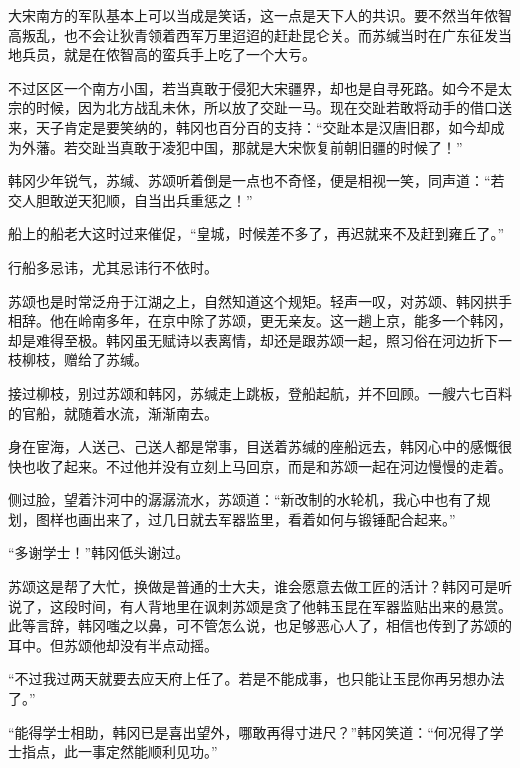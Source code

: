 大宋南方的军队基本上可以当成是笑话，这一点是天下人的共识。要不然当年侬智高叛乱，也不会让狄青领着西军万里迢迢的赶赴昆仑关。而苏缄当时在广东征发当地兵员，就是在侬智高的蛮兵手上吃了一个大亏。

不过区区一个南方小国，若当真敢于侵犯大宋疆界，却也是自寻死路。如今不是太宗的时候，因为北方战乱未休，所以放了交趾一马。现在交趾若敢将动手的借口送来，天子肯定是要笑纳的，韩冈也百分百的支持：“交趾本是汉唐旧郡，如今却成为外藩。若交趾当真敢于凌犯中国，那就是大宋恢复前朝旧疆的时候了！”

韩冈少年锐气，苏缄、苏颂听着倒是一点也不奇怪，便是相视一笑，同声道：“若交人胆敢逆天犯顺，自当出兵重惩之！”

船上的船老大这时过来催促，“皇城，时候差不多了，再迟就来不及赶到雍丘了。”

行船多忌讳，尤其忌讳行不依时。

苏颂也是时常泛舟于江湖之上，自然知道这个规矩。轻声一叹，对苏颂、韩冈拱手相辞。他在岭南多年，在京中除了苏颂，更无亲友。这一趟上京，能多一个韩冈，却是难得至极。韩冈虽无赋诗以表离情，却还是跟苏颂一起，照习俗在河边折下一枝柳枝，赠给了苏缄。

接过柳枝，别过苏颂和韩冈，苏缄走上跳板，登船起航，并不回顾。一艘六七百料的官船，就随着水流，渐渐南去。

身在宦海，人送己、己送人都是常事，目送着苏缄的座船远去，韩冈心中的感慨很快也收了起来。不过他并没有立刻上马回京，而是和苏颂一起在河边慢慢的走着。

侧过脸，望着汴河中的潺潺流水，苏颂道：“新改制的水轮机，我心中也有了规划，图样也画出来了，过几日就去军器监里，看着如何与锻锤配合起来。”

“多谢学士！”韩冈低头谢过。

苏颂这是帮了大忙，换做是普通的士大夫，谁会愿意去做工匠的活计？韩冈可是听说了，这段时间，有人背地里在讽刺苏颂是贪了他韩玉昆在军器监贴出来的悬赏。此等言辞，韩冈嗤之以鼻，可不管怎么说，也足够恶心人了，相信也传到了苏颂的耳中。但苏颂他却没有半点动摇。

“不过我过两天就要去应天府上任了。若是不能成事，也只能让玉昆你再另想办法了。”

“能得学士相助，韩冈已是喜出望外，哪敢再得寸进尺？”韩冈笑道：“何况得了学士指点，此一事定然能顺利见功。”

